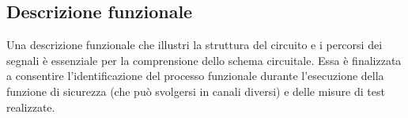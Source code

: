 \subsection{Descrizione funzionale}
\label{subsec:06-5-3}
Una descrizione funzionale che illustri la struttura del circuito e i percorsi dei segnali è essenziale per la comprensione dello schema circuitale. Essa è finalizzata a consentire l'identificazione del processo funzionale durante l'esecuzione della funzione di sicurezza (che può svolgersi in canali diversi) e delle misure di test realizzate.

\begin{center}
    \begin{minipage}{\textwidth}
        \centering
        \captionsetup{hypcap=false}
        \resizebox{0.92\textwidth}{!}{}
        \label{fig:06-15}
    \end{minipage}
\end{center}

